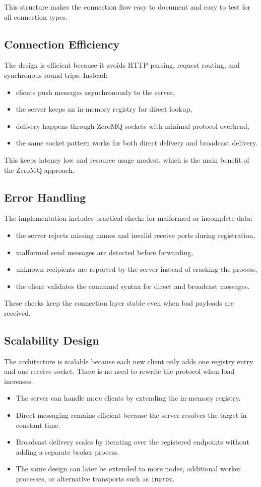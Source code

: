 \documentclass[a4paper,12pt]{article}
\begin{document}
This structure makes the connection flow easy to document and easy to test for all connection types.

\subsection{Connection Efficiency}
The design is efficient because it avoids HTTP parsing, request routing, and synchronous round trips. Instead:
\begin{itemize}[leftmargin=1.4em]
  \item clients push messages asynchronously to the server,
  \item the server keeps an in-memory registry for direct lookup,
  \item delivery happens through ZeroMQ sockets with minimal protocol overhead,
  \item the same socket pattern works for both direct delivery and broadcast delivery.
\end{itemize}

This keeps latency low and resource usage modest, which is the main benefit of the ZeroMQ approach.

\subsection{Error Handling}
The implementation includes practical checks for malformed or incomplete data:
\begin{itemize}[leftmargin=1.4em]
  \item the server rejects missing names and invalid receive ports during registration,
  \item malformed send messages are detected before forwarding,
  \item unknown recipients are reported by the server instead of crashing the process,
  \item the client validates the command syntax for direct and broadcast messages.
\end{itemize}

These checks keep the connection layer stable even when bad payloads are received.

\subsection{Scalability Design}
The architecture is scalable because each new client only adds one registry entry and one receive socket. There is no need to rewrite the protocol when load increases.
\begin{itemize}[leftmargin=1.4em]
  \item The server can handle more clients by extending the in-memory registry.
  \item Direct messaging remains efficient because the server resolves the target in constant time.
  \item Broadcast delivery scales by iterating over the registered endpoints without adding a separate broker process.
  \item The same design can later be extended to more nodes, additional worker processes, or alternative transports such as \texttt{inproc}.
\end{itemize}
\end{document}
